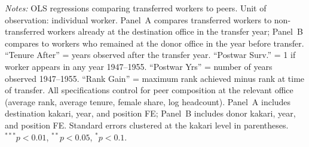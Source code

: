 \begin{table}[htbp]
\begin{threeparttable}
\begin{tablenotes}[flushleft]
\footnotesize
\item \textit{Notes:} OLS regressions comparing transferred workers to peers. Unit of observation: individual worker. Panel~A compares transferred workers to non-transferred workers already at the destination office in the transfer year; Panel~B compares to workers who remained at the donor office in the year before transfer. ``Tenure After'' = years observed after the transfer year. ``Postwar Surv.'' = 1 if worker appears in any year 1947--1955. ``Postwar Yrs'' = number of years observed 1947--1955. ``Rank Gain'' = maximum rank achieved minus rank at time of transfer. All specifications control for peer composition at the relevant office (average rank, average tenure, female share, log headcount). Panel~A includes destination kakari, year, and position FE; Panel~B includes donor kakari, year, and position FE. Standard errors clustered at the kakari level in parentheses. $^{***}p<0.01$, $^{**}p<0.05$, $^{*}p<0.1$.
\end{tablenotes}
\end{threeparttable}
\end{table}
